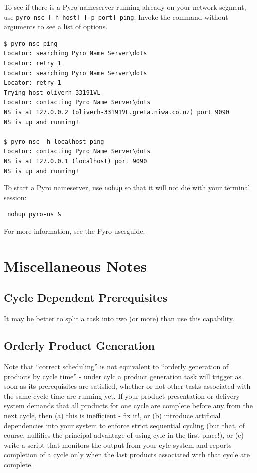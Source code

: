 \documentclass[11pt,a4paper]{article}
\begin{document}
To see if there is a Pyro nameserver running already on your network
segment, use \lstinline=pyro-nsc [-h host] [-p port] ping=. Invoke the
command without arguments to see a list of options.

\lstset{language=bash}

\begin{lstlisting}
$ pyro-nsc ping
Locator: searching Pyro Name Server\dots
Locator: retry 1
Locator: searching Pyro Name Server\dots
Locator: retry 1
Trying host oliverh-33191VL
Locator: contacting Pyro Name Server\dots
NS is at 127.0.0.2 (oliverh-33191VL.greta.niwa.co.nz) port 9090
NS is up and running!

$ pyro-nsc -h localhost ping
Locator: contacting Pyro Name Server\dots
NS is at 127.0.0.1 (localhost) port 9090
NS is up and running!
\end{lstlisting}

To start a Pyro nameserver, use \lstinline{nohup} so that it
will not die with your terminal session: 

\begin{lstlisting}
 nohup pyro-ns &
\end{lstlisting}

For more information, see the Pyro userguide.

\pagebreak
\section{Miscellaneous Notes}
\label{MiscellaneousNotes}

\subsection{Cycle Dependent Prerequisites}

It may be better to split a task into two (or more) than use this 
capability.

\subsection{Orderly Product Generation}
\label{OrderlyProductGeneration}

Note that ``correct scheduling'' is not equivalent to ``orderly
generation of products by cycle time'' - under cylc a product
generation task will trigger as soon as its prerequisites are satisfied,
whether or not other tasks associated with the same cycle time are
running yet. If your product presentation or delivery system demands
that all products for one cycle are complete before any from the next
cycle, then (a) this is inefficient - fix it!, or (b) introduce artificial
dependencies into your system to enforce strict sequential cycling (but
that, of course, nullifies the principal advantage of using cylc in the
first place!), or (c) write a script that monitors the output from 
your cylc system and reports completion of a cycle only when the last
products associated with that cycle are complete. 
\end{document}
